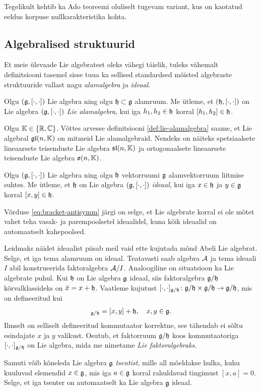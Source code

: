 Tegelikult kehtib ka Ado teoreemi oluliselt tugevam variant,
kus on kaotatud eeldus korpuse nullkarakteristika
kohta. \cite{hochschild1966}

\subsection{Algebralised struktuurid}\label{subsec:algebralised-struktuurid}

Et meie ülevaade Lie algebratest oleks vähegi täielik, tuleks vähemalt
definitsiooni tasemel sisse tuua ka sellised standardsed mõisted algebraste
struktuuride vallast nagu \emph{alamalgebra} ja \emph{ideaal}.

\begin{dfn}\label{def:lie-alamalgebra}
    Olgu $(\mathfrak{g}, [\cdot, \cdot])$ Lie algebra ning olgu $\mathfrak{h} \subset \mathfrak{g}$ alamruum.
    Me ütleme, et $(\mathfrak{h}, [\cdot, \cdot])$ on Lie algebra $(\mathfrak{g}, [\cdot, \cdot])$
    \emph{Lie alamalgebra}, kui iga $h_1, h_2 \in \mathfrak{h}$ korral
    $[h_1, h_2] \in \mathfrak{h}$.
\end{dfn}

Olgu $\mathbb{K} \in \{\mathbb{R}, \mathbb{C}\}$. Võttes arvesse definitsiooni
\ref{def:lie-alamalgebra} saame, et Lie algebral $\mathfrak{gl}(n, \mathbb{K})$ on mitmeid
Lie alamalgebraid. Nendeks on näiteks spetsiaalsete lineaarsete teisenduste
Lie algebra $\mathfrak{sl}(n, \mathbb{K})$ ja ortogonaalsete lineaarsete teisenduste
Lie algebra $\mathfrak{o}(n, \mathbb{K})$.

\begin{dfn}
    Olgu $(\mathfrak{g}, [\cdot, \cdot])$ Lie algebra ning olgu $\mathfrak{h}$ vektorruumi $\mathfrak{g}$
    alamvektorruum liitmise suhtes. Me ütleme, et $\mathfrak{h}$ on Lie algebra
    $(\mathfrak{g}, [\cdot, \cdot])$ \emph{ideaal}, kui iga $x \in \mathfrak{h}$ ja $y \in \mathfrak{g}$
    korral $[x, y] \in \mathfrak{h}$.
\end{dfn}

Võrduse \eqref{eq:bracket-antisymm} järgi on selge, et Lie algebrate
korral ei ole mõtet vahet teha vasak- ja
parempoolsetel ideaalidel, kuna kõik ideaalid on automaatselt kahepoolsed.

Leidmaks näidet ideaalist piisab meil vaid ette kujutada mõnd Abeli
Lie algebrat. Selge, et iga tema alamruum on ideaal. Teatavasti saab
algebra $\mathcal{A}$ ja tema ideaali $I$ abil konstrueerida faktoralgebra
$\mathcal{A} / I$. Analoogiline
on situatsioon ka Lie algebrate puhul. Kui $\mathfrak{h}$ on Lie algebra $\mathfrak{g}$ ideaal,
siis faktoralgebra $\mathfrak{g} / \mathfrak{h}$ kõrvalklassideks on $\bar{x} = x + \mathfrak{h}$.
Vaatleme kujutust
$[\cdot, \cdot]_{\mathfrak{g} / \mathfrak{h}} \colon \mathfrak{g} / \mathfrak{h} \times \mathfrak{g} / \mathfrak{h} \to \mathfrak{g} / \mathfrak{h}$,
mis on defineeritud kui
\begin{align*}
    [x+\h, y+\h]_{\g / \h} = [x, y] + \h, \quad x, y \in \g.
\end{align*}
Ilmselt on selliselt defineeritud kommutaator korrektne, see tähendab ei sõltu
esindajate $x$ ja $y$ valikust. Osutub, et faktorruum $\mathfrak{g} / \mathfrak{h}$ koos
kommutaatoriga $[\cdot, \cdot]_{\mathfrak{g} / \mathfrak{h}}$ on Lie algebra, mida me
nimetame \emph{Lie faktoralgebraks}.

Samuti võib kõneleda Lie algebra $\mathfrak{g}$ \emph{tsentist}, mille all mõeldakse
hulka, kuhu kuuluvad elemendid $x \in \mathfrak{g}$, mis iga $a \in \mathfrak{g}$ korral rahuldavad
tingimust $[x, a] = 0$. Selge, et iga tsenter on automaatselt ka Lie algebra
$\mathfrak{g}$ ideaal.
